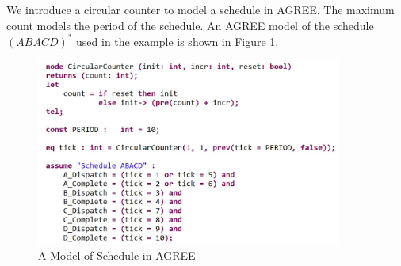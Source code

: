 We introduce a circular counter to model a schedule in AGREE. The maximum count models the period of the schedule. An AGREE model of the schedule $(ABACD)^*$ used in the example is shown in Figure \ref{schedule}.
\begin{figure}[ht!]
\centering
\includegraphics[width=100mm]{schedule.jpg}
\caption{A Model of Schedule in AGREE\label{schedule}}
\end{figure}



%				
%

%	
%

